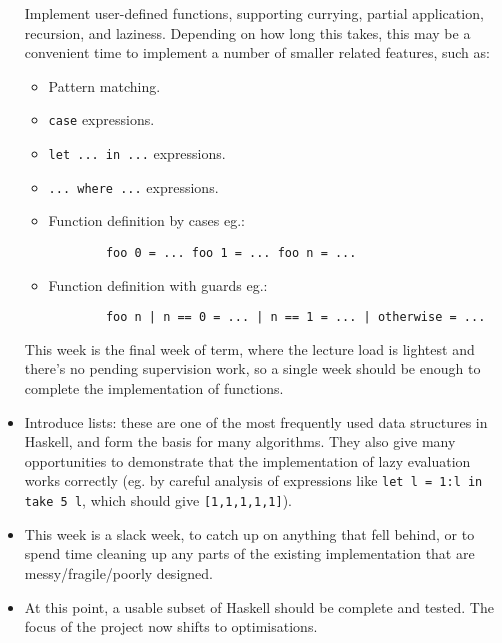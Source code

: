 \documentclass[12pt]{article}
\newcommand\haskell[1]{\texttt{#1}}
\begin{document}
\begin{itemize}
{    Implement user-defined functions, supporting currying, partial application, recursion, and laziness. Depending on
    how long this takes, this may be a convenient time to implement a number of smaller related features, such as:
    
    \begin{itemize}
    \item Pattern matching.
    \item \haskell{case} expressions.
    \item \haskell{let ... in ...} expressions.
    \item \haskell{... where ...} expressions.
    \item
    {

        Function definition by cases eg.:
        \begin{verbatim}
        foo 0 = ... foo 1 = ... foo n = ...
        \end{verbatim}
    }
    \item
    {

        Function definition with guards eg.:
        \begin{verbatim}
        foo n | n == 0 = ... | n == 1 = ... | otherwise = ...
        \end{verbatim}
    }
    \end{itemize}

    This week is the final week of term, where the lecture load is lightest and there's no pending supervision work, so
    a single week should be enough to complete the implementation of functions.
}
\item
{

    Introduce lists: these are one of the most frequently used data structures in Haskell, and form the basis for many
    algorithms. They also give many opportunities to demonstrate that the implementation of lazy evaluation works
    correctly (eg. by careful analysis of expressions like \haskell{let l = 1:l in take 5 l}, which should give
    \haskell{[1,1,1,1,1]}).
}
\item
{

    This week is a slack week, to catch up on anything that fell behind, or to spend time cleaning up any parts of the
    existing implementation that are messy/fragile/poorly designed.
}
\item
{

    At this point, a usable subset of Haskell should be complete and tested. The focus of the project now shifts to optimisations.

}
\end{itemize}
\end{document}
